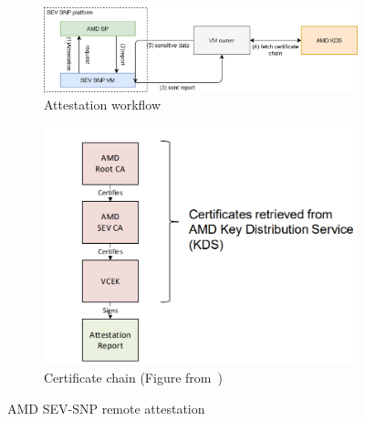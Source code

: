 \begin{figure}[htp]
  \centering
  \begin{subfigure}[b]{0.65\textwidth}
      \centering
      \includegraphics[width=\textwidth]{images/amd_attestation_workflow.PNG}
      \caption{Attestation workflow}
      \label{fig:amd_attestation_workflow}
  \end{subfigure}
  \hfill
  \begin{subfigure}[b]{0.3\textwidth}
      \centering
      \includegraphics[width=\textwidth]{images/amd_snp_certificate_chain.PNG}
      \caption{Certificate chain (Figure from~\cite*{amd_Sev_snp_ppt})}
      \label{fig:amd_snp_certificate_chain}
  \end{subfigure}
  \hfill
     \caption[AMD SEV-SNP remote attestation]{AMD SEV-SNP remote attestation}
     \label{fig:amd_snp_atteation}
\end{figure}

